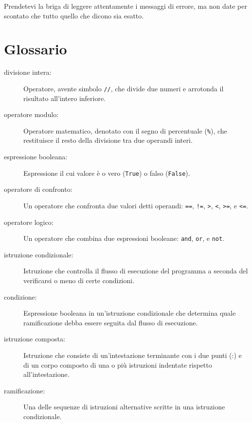 \documentclass[10pt]{book}
\begin{document}
Prendetevi la briga di leggere attentamente i messaggi di errore, ma non date per scontato che tutto quello che dicono sia esatto.


\section{Glossario}

\begin{description}

\item[divisione intera:] Operatore, avente simbolo {\tt //}, che divide due numeri e arrotonda il risultato all'intero inferiore.
  
\item[operatore modulo:]  Operatore matematico, denotato con il segno di percentuale ({\tt \%}), che restituisce il resto della divisione tra due operandi
interi.

\item[espressione booleana:]  Espressione il cui valore è o vero 
({\tt True}) o falso ({\tt False}).

\item[operatore di confronto:] Un operatore che confronta due valori detti operandi: {\tt ==}, {\tt !=}, {\tt >}, {\tt <}, {\tt >=}, e {\tt <=}.

\item[operatore logico:] Un operatore che combina due espressioni booleane: {\tt and}, {\tt or}, e {\tt not}.

\item[istruzione condizionale:]  Istruzione che controlla il flusso di esecuzione del programma a seconda del verificarsi o meno di certe condizioni.

\item[condizione:] Espressione booleana in un'istruzione condizionale che      determina quale ramificazione debba essere seguita dal flusso di esecuzione.

\item[istruzione composta:]  Istruzione che consiste di un'intestazione terminante con i due punti (:) e di un corpo composto di una o più istruzioni
indentate rispetto all'intestazione.

\item[ramificazione:] Una delle sequenze di istruzioni alternative scritte in una istruzione condizionale.


\end{description}
\end{document}
